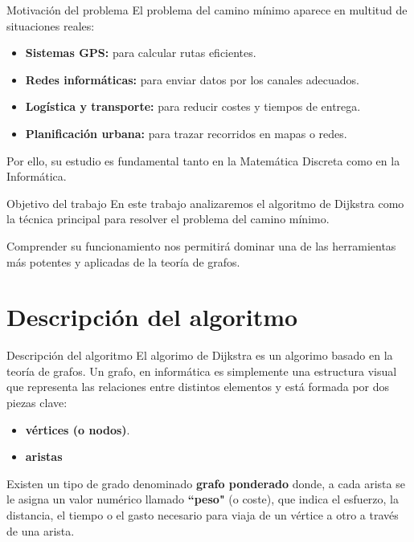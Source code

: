 \documentclass{beamer}
\begin{document}
    \begin{frame}{Motivación del problema}
        El problema del camino mínimo aparece en multitud de situaciones reales:

        \begin{itemize}
            \item \textbf{Sistemas GPS:} para calcular rutas eficientes.
            \item \textbf{Redes informáticas:} para enviar datos por los canales adecuados.
            \item \textbf{Logística y transporte:} para reducir costes y tiempos de entrega.
            \item \textbf{Planificación urbana:} para trazar recorridos en mapas o redes.
        \end{itemize}

        \vspace{0.2cm}

        Por ello, su estudio es fundamental tanto en la Matemática Discreta como en la Informática.
    \end{frame}

    \begin{frame}{Objetivo del trabajo}
        En este trabajo analizaremos el algoritmo de Dijkstra como la técnica principal para resolver el problema del camino mínimo.

        \vspace{0.4cm}

        Comprender su funcionamiento nos permitirá dominar una de las herramientas más potentes y aplicadas de la teoría de grafos.
    \end{frame}

    \section{Descripción del algoritmo}
    

    \begin{frame}{Descripción del algoritmo}
        El algorimo de Dijkstra es un algorimo basado en la teoría de grafos. Un grafo, en informática es simplemente una estructura visual que representa las relaciones entre distintos elementos y está formada por dos piezas clave: 
        \begin{itemize}
            \item \textbf{vértices (o nodos)}.
            \item \textbf{aristas}
        \end{itemize}
        Existen un tipo de grado denominado \textbf{grafo ponderado} donde, a cada arista se le asigna un valor numérico llamado \textbf{``peso"} (o coste), que indica el esfuerzo, la distancia, el tiempo o el gasto necesario para viaja de un vértice a otro a través de una arista. 
    \end{frame}
\end{document}
